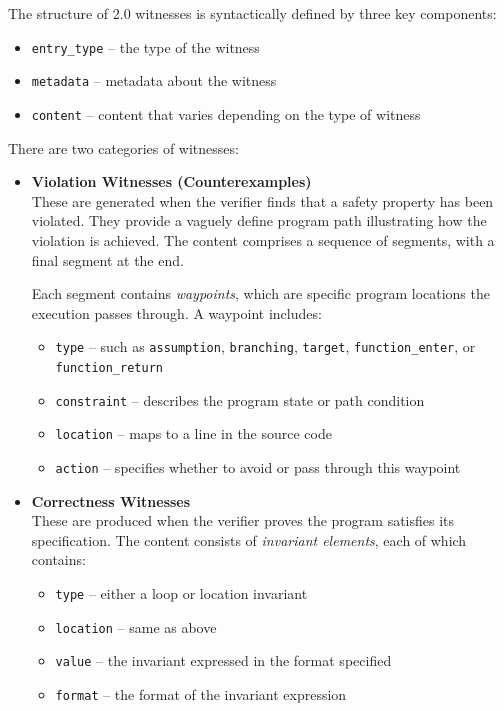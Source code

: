 The structure of 2.0 witnesses is syntactically defined by three key components:
\begin{itemize}
  \item \texttt{entry\_type} – the type of the witness
  \item \texttt{metadata} – metadata about the witness
  \item \texttt{content} – content that varies depending on the type of witness
\end{itemize}

There are two categories of witnesses:

\begin{itemize}
  \item \textbf{Violation Witnesses (Counterexamples)}\\
  These are generated when the verifier finds that a safety property has been violated. 
  They provide a vaguely define program path illustrating how the violation is achieved. 
  The content comprises a sequence of segments, with a final segment at the end.

  Each segment contains \textit{waypoints}, which are specific program locations the execution passes through. A waypoint includes:
  \begin{itemize}
    \item \texttt{type} – such as \texttt{assumption}, \texttt{branching}, \texttt{target}, \texttt{function\_enter}, or \texttt{function\_return}
    \item \texttt{constraint} – describes the program state or path condition
    \item \texttt{location} – maps to a line in the source code
    \item \texttt{action} – specifies whether to avoid or pass through this waypoint
  \end{itemize}

  \item \textbf{Correctness Witnesses}\\
  These are produced when the verifier proves the program satisfies its specification. 
  The content consists of \textit{invariant elements}, each of which contains:
  \begin{itemize}
    \item \texttt{type} – either a loop or location invariant
    \item \texttt{location} – same as above
    \item \texttt{value} – the invariant expressed in the format specified
    \item \texttt{format} – the format of the invariant expression 
  \end{itemize}
\end{itemize}


